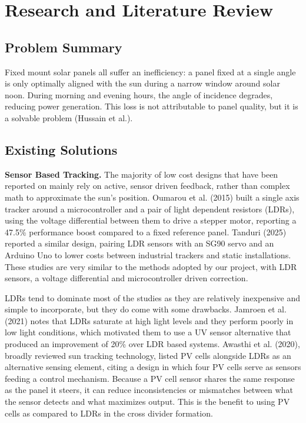 \documentclass[journal]{IEEEtran}
\begin{document}
\section{Research and Literature Review}

\subsection{Problem Summary}

Fixed mount solar panels all suffer an inefficiency: a panel fixed at a single angle is
only optimally aligned with the sun during a narrow window around solar noon. During
morning and evening hours, the angle of incidence degrades, reducing power generation.
This loss is not attributable to panel quality, but it is a solvable problem (Hussain et
al.).

\subsection{Existing Solutions}

\textbf{Sensor Based Tracking.} The majority of low cost designs that have been
reported on mainly rely on active, sensor driven feedback, rather than complex math to
approximate the sun's position. Oumarou et al. (2015) built a single axis tracker
around a microcontroller and a pair of light dependent resistors (LDRs), using the
voltage differential between them to drive a stepper motor, reporting a 47.5\%
performance boost compared to a fixed reference panel. Tanduri (2025) reported a
similar design, pairing LDR sensors with an SG90 servo and an Arduino Uno to lower
costs between industrial trackers and static installations. These studies are very
similar to the methods adopted by our project, with LDR sensors, a voltage differential
and microcontroller driven correction.

LDRs tend to dominate most of the studies as they are relatively inexpensive and
simple to incorporate, but they do come with some drawbacks. Jamroen et al. (2021)
notes that LDRs saturate at high light levels and they perform poorly in low light
conditions, which motivated them to use a UV sensor alternative that produced an
improvement of 20\% over LDR based systems. Awasthi et al. (2020), broadly reviewed
sun tracking technology, listed PV cells alongside LDRs as an alternative sensing
element, citing a design in which four PV cells serve as sensors feeding a control
mechanism. Because a PV cell sensor shares the same response as the panel it steers, it
can reduce inconsistencies or mismatches between what the sensor detects and what
maximizes output. This is the benefit to using PV cells as compared to LDRs in the cross
divider formation.
\end{document}
